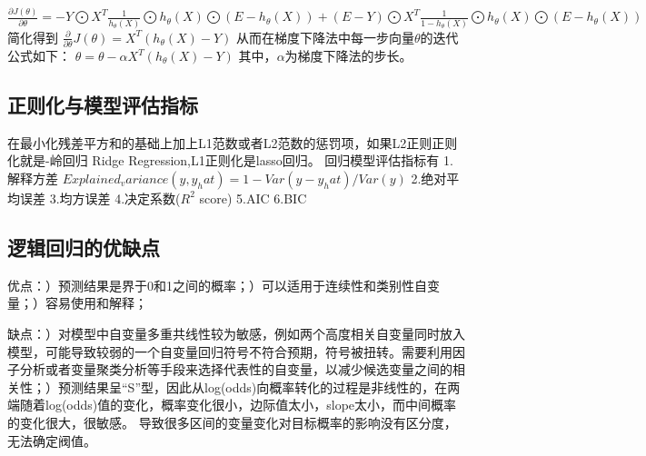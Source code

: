 \documentclass[18pt,a4paper,oneside,UTF8]{ctexart}
\begin{document}
$\frac {\partial{J(\theta)}}{\partial \theta}=−Y\bigodot X^T \frac {1}{h_\theta(X)}\bigodot h_\theta(X)\bigodot(E−h_\theta(X))+(E−Y)\bigodot X^T \frac{1}{1−h_\theta(X)}\bigodot h_\theta(X)\bigodot(E−h_\theta(X))$\newline
简化得到\newline
$\frac {\partial}{\partial \theta} J(\theta)=X^T(h_\theta(X)-Y)$\newline
从而在梯度下降法中每一步向量$\theta$的迭代公式如下：\newline
$\theta=\theta-\alpha X^T(h_\theta(X)-Y)$\newline
其中，$\alpha$为梯度下降法的步长。
\subsection{正则化与模型评估指标}
在最小化残差平方和的基础上加上L1范数或者L2范数的惩罚项，如果L2正则正则化就是-岭回归 Ridge Regression,L1正则化是lasso回归。
回归模型评估指标有\newline
1.解释方差\newline
$Explained_variance(y,y_hat)=1-Var(y-y_hat)/Var(y)$
2.绝对平均误差\newline
3.均方误差\newline
4.决定系数($R^2$ score)\newline
5.AIC\newline
6.BIC\newline
\subsection{逻辑回归的优缺点} 

优点：\newline{}）预测结果是界于0和1之间的概率；\newline{}）可以适用于连续性和类别性自变量；\newline{}）容易使用和解释；\newline\newline

缺点：\newline{}）对模型中自变量多重共线性较为敏感，例如两个高度相关自变量同时放入模型，可能导致较弱的一个自变量回归符号不符合预期，符号被扭转。​需要利用因子分析或者变量聚类分析等手段来选择代表性的自变量，以减少候选变量之间的相关性；\newline{}）预测结果呈“S”型，因此从log(odds)向概率转化的过程是非线性的，在两端随着​log(odds)值的变化，概率变化很小，边际值太小，slope太小，而中间概率的变化很大，很敏感。 导致很多区间的变量变化对目标概率的影响没有区分度，无法确定阀值。\newline\newline
\end{document}
